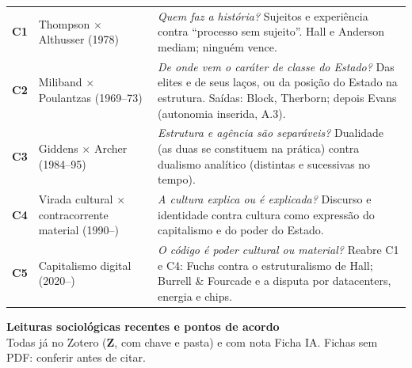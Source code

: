 \documentclass[10pt]{article}
\begin{document}
\vspace{2pt}
\footnotesize
\begin{tabularx}{\textwidth}{@{}>{\bfseries\color{contr}}l >{\raggedright\arraybackslash}p{6.2cm} X@{}}
C1 & Thompson $\times$ Althusser (1978) & \emph{Quem faz a história?} Sujeitos e experiência contra ``processo sem sujeito''. Hall e Anderson mediam; ninguém vence. \\
C2 & Miliband $\times$ Poulantzas (1969--73) & \emph{De onde vem o caráter de classe do Estado?} Das elites e de seus laços, ou da posição do Estado na estrutura. Saídas: Block, Therborn; depois Evans (autonomia inserida, A.3). \\
C3 & Giddens $\times$ Archer (1984--95) & \emph{Estrutura e agência são separáveis?} Dualidade (as duas se constituem na prática) contra dualismo analítico (distintas e sucessivas no tempo). \\
C4 & Virada cultural $\times$ contracorrente material (1990--) & \emph{A cultura explica ou é explicada?} Discurso e identidade contra cultura como expressão do capitalismo e do poder do Estado. \\
C5 & Capitalismo digital (2020--) & \emph{O código é poder cultural ou material?} Reabre C1 e C4: Fuchs contra o estruturalismo de Hall; Burrell \& Fourcade e a disputa por datacenters, energia e chips. \\
\end{tabularx}

\newpage
\begin{center}
{\Large\bfseries Leituras sociológicas recentes e pontos de acordo}\\[2pt]
{\small Todas já no Zotero (\textbf{Z}, com chave e pasta) e com nota Ficha IA. Fichas sem PDF: conferir antes de citar.}
\end{center}
\end{document}
